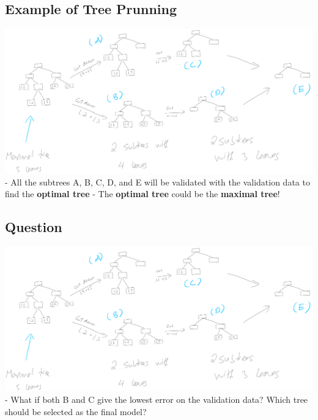 \documentclass[
]{article}
\begin{document}
\hypertarget{example-of-tree-prunning-1}{%
\subsection{Example of Tree Prunning}\label{example-of-tree-prunning-1}}

\includegraphics{images/tree9.png} - All the subtrees A, B, C, D, and E
will be validated with the validation data to find the \textbf{optimal
tree} - The \textbf{optimal tree} could be the \textbf{maximal tree}!

\hypertarget{question-1}{%
\subsection{Question}\label{question-1}}

\includegraphics{images/tree9.png} - What if both B and C give the
lowest error on the validation data? Which tree should be selected as
the final model?
\end{document}
